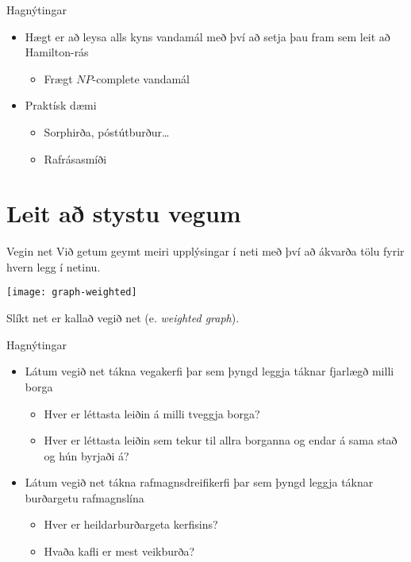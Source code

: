 \documentclass{beamer}
\begin{document}
\begin{frame}{Hagnýtingar}
\begin{itemize}
 \item Hægt er að leysa alls kyns vandamál með því að setja þau fram sem leit að Hamilton-rás
 \begin{itemize}
  \item Frægt $NP$-complete vandamál
 \end{itemize}
 \item Praktísk dæmi
 \begin{itemize}
  \item Sorphirða, póstútburður\ldots
  \item Rafrásasmíði
 \end{itemize}
\end{itemize}
\end{frame}


\section{Leit að stystu vegum}

\begin{frame}{Vegin net}
Við getum geymt meiri upplýsingar í neti með því að ákvarða tölu fyrir hvern legg í netinu.
\begin{center}
\texttt{[image: graph-weighted]}
\end{center}
Slíkt net er kallað vegið net (e. \emph{weighted graph}).
\end{frame}

\begin{frame}{Hagnýtingar}
\begin{itemize}
 \item Látum vegið net tákna vegakerfi þar sem þyngd leggja táknar fjarlægð milli borga
 \begin{itemize}
  \item Hver er léttasta leiðin á milli tveggja borga?
  \item Hver er léttasta leiðin sem tekur til allra borganna og endar á sama stað og hún byrjaði á?
 \end{itemize}
 \item Látum vegið net tákna rafmagnsdreifikerfi þar sem þyngd leggja táknar burðargetu rafmagnslína
 \begin{itemize}
  \item Hver er heildarburðargeta kerfisins?
  \item Hvaða kafli er mest veikburða?
 \end{itemize}
\end{itemize}
\end{frame}
\end{document}
